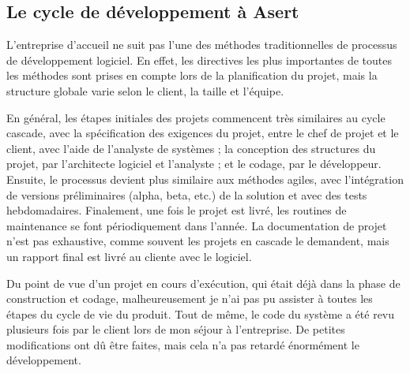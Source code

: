 \subsection{Le cycle de développement à Asert}\label{cycle}

L'entreprise d'accueil ne suit pas l'une des méthodes traditionnelles de processus de développement logiciel. En effet, les directives les plus importantes de toutes les méthodes sont prises en compte lors de la planification du projet, mais la structure globale varie selon le client, la taille et l'équipe.

En général, les étapes initiales des projets commencent très similaires au cycle cascade, avec la spécification des exigences du projet, entre le chef de projet et le client, avec l'aide de l'analyste de systèmes ; la conception des structures du projet, par l'architecte logiciel et l'analyste ; et le codage, par le développeur. Ensuite, le processus devient plus similaire aux méthodes agiles, avec l'intégration de versions préliminaires (alpha, beta, etc.) de la solution et avec des tests hebdomadaires. Finalement, une fois le projet est livré, les routines de maintenance se font périodiquement dans l'année. La documentation de projet n'est pas exhaustive, comme souvent les projets en cascade le demandent, mais un rapport final est livré au cliente avec le logiciel.

Du point de vue d'un projet en cours d'exécution, qui était déjà dans la phase de construction et codage, malheureusement je n'ai pas pu assister à toutes les étapes du cycle de vie du produit. Tout de même, le code du système a été revu plusieurs fois par le client lors de mon séjour à l'entreprise. De petites modifications ont dû être faites, mais cela n'a pas retardé énormément le développement.